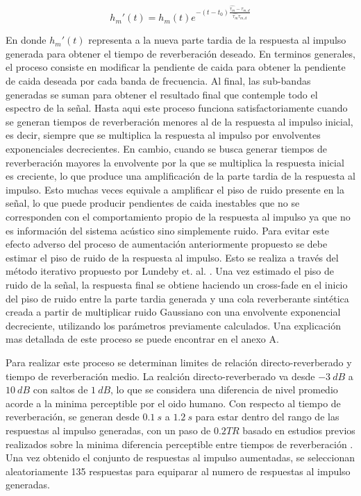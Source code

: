 \begin{equation}
\label{eqn:aug_tr}
	{h_{m}}'(t) = h_{m}(t) e^{-(t-t_{0})\frac{\hat{\tau_{m}}-\tau_{m,d}}{\hat{\tau_{m}}\tau_{m,d}}}
\end{equation}

En donde ${h_{m}}'(t)$ representa a la nueva parte tardia de la respuesta al impulso generada para obtener el tiempo de reverberación deseado. En terminos generales, el proceso consiste en modificar la pendiente de caida para obtener la pendiente de caida deseada por cada banda de frecuencia. Al final, las sub-bandas generadas se suman para obtener el resultado final que contemple todo el espectro de la señal. Hasta aqui este proceso funciona satisfactoriamente cuando se generan tiempos de reverberación menores al de la respuesta al impulso inicial, es decir, siempre que se multiplica la respuesta al impulso por envolventes exponenciales decrecientes. En cambio, cuando se busca generar tiempos de reverberación mayores la envolvente por la que se multiplica la respuesta inicial es creciente, lo que produce una amplificación de la parte tardia de la respuesta al impulso. Esto muchas veces equivale a amplificar el piso de ruido presente en la señal, lo que puede producir pendientes de caida inestables que no se corresponden con el comportamiento propio de la respuesta al impulso ya que no es información del sistema acústico sino simplemente ruido. Para evitar este efecto adverso del proceso de aumentación anteriormente propuesto se debe estimar el piso de ruido de la respuesta al impulso. Esto se realiza a través del método iterativo propuesto por Lundeby et. al. \cite{Lundeby}. Una vez estimado el piso de ruido de la señal, la respuesta final se obtiene haciendo un cross-fade en el inicio del piso de ruido entre la parte tardia generada y una cola reverberante sintética creada a partir de multiplicar ruido Gaussiano con una envolvente exponencial decreciente, utilizando los parámetros previamente calculados. Una explicación mas detallada de este proceso se puede encontrar en el anexo A. 

Para realizar este proceso se determinan limites de relación directo-reverberado y tiempo de reverberación medio. La realción directo-reverberado va desde $-3 \ dB$ a $10 \ dB$ con saltos de $1 \ dB$, lo que se considera una diferencia de nivel promedio acorde a la minima perceptible por el oido humano. Con respecto al tiempo de reverberación, se generan desde $0.1 \ s$ a $1.2 \ s$ para estar dentro del rango de las respuestas al impulso generadas, con un paso de $0.2TR$ basado en estudios previos realizados sobre la minima diferencia perceptible entre tiempos de reverberación \cite{aug_JND}. Una vez obtenido el conjunto de respuestas al impulso aumentadas, se seleccionan aleatoriamente 135 respuestas para equiparar al numero de respuestas al impulso generadas. 

